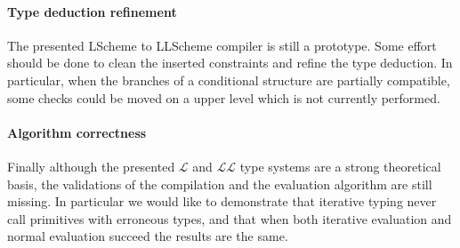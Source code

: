 \documentclass[a4paper]{report}
\newcommand{\lang}[0]{\mathcal{L}}
\begin{document}
\paragraph{Type deduction refinement} The presented LScheme to LLScheme compiler is still a prototype. Some effort should be done to clean the inserted constraints and refine the type deduction. In particular, when the branches of a conditional structure are partially compatible, some checks could be moved on a upper level which is not currently performed.

\paragraph{Algorithm correctness}  Finally although the presented $\lang$ and $\lang\lang$ type systems are a strong theoretical basis, the validations of the compilation and the evaluation algorithm are still missing. In particular we would like to demonstrate that iterative typing never call primitives with erroneous types, and that when both iterative evaluation and normal evaluation succeed the results are the same.
\end{document}
